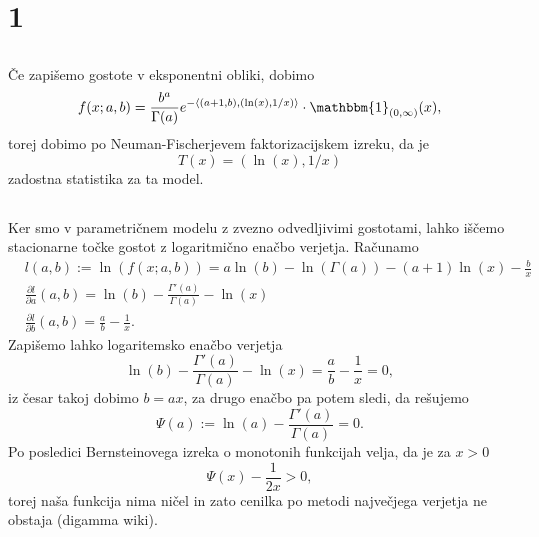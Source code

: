 \documentclass[ letterpaper, titlepage, fleqn]{article}
\newcommand{\scalar}[1]{\left\langle#1\right\rangle}
\newcommand{\ind}{\mathbbm{1}}
\begin{document}
\section{1}

\subsection{}
Če zapišemo gostote v eksponentni obliki, dobimo
$$f(x; a,b) = \frac{b^a}{\Gamma(a)} e^{-\scalar{(a+1, b), (\ln(x), 1/x)}} \cdot \ind_{(0,\infty)}(x),$$
torej dobimo po Neuman-Fischerjevem faktorizacijskem izreku, da je
$$T(x) = (\ln(x), 1/x)$$
zadostna statistika za ta model.

\subsection{}
Ker smo v parametričnem modelu z zvezno odvedljivimi gostotami, lahko iščemo stacionarne točke gostot 
z logaritmično enačbo verjetja. Računamo
\begin{equation*}
\begin{aligned}
&l(a,b) := \ln(f(x; a,b)) = a\ln(b) - \ln(\Gamma(a)) - (a+1)\ln(x) - \frac{b}{x} \\
&\frac{\partial l}{\partial a}(a,b) = \ln(b) - \frac{\Gamma'(a)}{\Gamma(a)} - \ln(x) \\
&\frac{\partial l}{\partial b}(a,b) = \frac{a}{b} - \frac{1}{x}.
\end{aligned}
\end{equation*}
Zapišemo lahko logaritemsko enačbo verjetja
$$\ln(b) - \frac{\Gamma'(a)}{\Gamma(a)} - \ln(x) = \frac{a}{b} - \frac{1}{x} = 0,$$
iz česar takoj dobimo $b = ax$, za drugo enačbo pa potem sledi, da rešujemo
$$\Psi(a) := \ln(a) - \frac{\Gamma'(a)}{\Gamma(a)} = 0.$$
Po posledici Bernsteinovega izreka o monotonih funkcijah velja, da je za $x > 0$
$$\Psi(x) - \frac{1}{2x} > 0,$$
torej naša funkcija nima ničel in zato cenilka po metodi največjega verjetja ne obstaja (digamma wiki).
\end{document}
